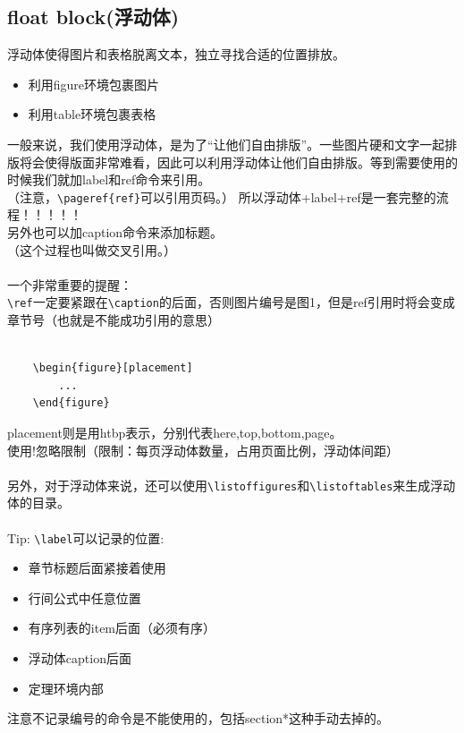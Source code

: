\documentclass{article}
\begin{document}
\subsection{float block(浮动体)}
\noindent
浮动体使得图片和表格脱离文本，独立寻找合适的位置排放。\\
\begin{itemize}
    \item 利用figure环境包裹图片
    \item 利用table环境包裹表格
\end{itemize}
一般来说，我们使用浮动体，是为了“让他们自由排版”。一些图片硬和文字一起排版将会使得版面非常难看，因此可以利用浮动体让他们自由排版。等到需要使用的时候我们就加label和ref命令来引用。\\
（注意，\verb|\pageref{ref}|可以引用页码。）
所以浮动体+label+ref是一套完整的流程！！！！！\\
另外也可以加caption命令来添加标题。\\
（这个过程也叫做交叉引用。）\\
\\
一个非常重要的提醒：\\
\verb|\ref|一定要紧跟在\verb|\caption|的后面，否则图片编号是图1，但是ref引用时将会变成章节号（也就是不能成功引用的意思）\\
\\
\begin{verbatim}
    \begin{figure}[placement]
        ...
    \end{figure}
\end{verbatim}
placement则是用htbp表示，分别代表here,top,bottom,page。\\
使用!忽略限制（限制：每页浮动体数量，占用页面比例，浮动体间距）\\
\\
另外，对于浮动体来说，还可以使用\verb|\listoffigures|和\verb|\listoftables|来生成浮动体的目录。\\
\\
Tip: \verb|\label|可以记录的位置:
\begin{itemize}
    \item 章节标题后面紧接着使用
    \item 行间公式中任意位置
    \item 有序列表的item后面（必须有序）
    \item 浮动体caption后面
    \item 定理环境内部
\end{itemize}
注意不记录编号的命令是不能使用的，包括section*这种手动去掉的。
\end{document}
